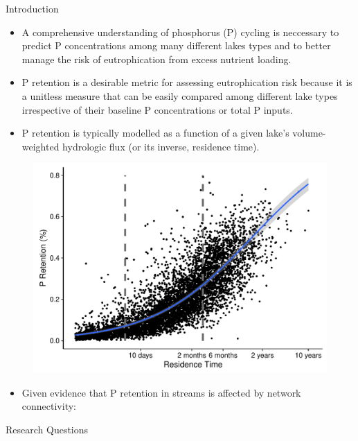 \documentclass[final,hyperref={pdfpagelabels=false}]{beamer}
\begin{document}
\begin{frame}[t]
\begin{columns}[t]
\begin{column}{.465\textwidth}
\begin{block}{Introduction}
\begin{itemize}
\item A comprehensive understanding of phosphorus (P) cycling is neccessary to predict P concentrations among many different lakes types and to better manage the risk of eutrophication from excess nutrient loading.
\vspace{1em}
\item P retention is a desirable metric for assessing eutrophication risk because it is a unitless measure that can be easily compared among different lake types irrespective of their baseline P concentrations or total P inputs.
\vspace{1em}
\item P retention is typically modelled as a function of a given lake's volume-weighted hydrologic flux (or its inverse, \alert{residence time}).
\end{itemize}
\vspace{2em}
\begin{figure}
\includegraphics[width=\linewidth]{milstead_single.pdf}
\end{figure}

\begin{itemize}
\item Given evidence that P retention in streams is affected by network connectivity:
\end{itemize}

\end{block}


{
\begin{block}{Research Questions}


\end{block}}
\end{column}
\end{columns}
\end{frame}
\end{document}
